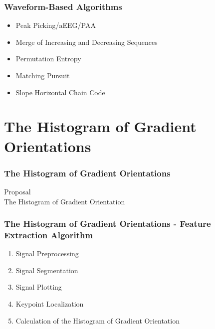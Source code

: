 \documentclass[aspectratio=169]{beamer}
\begin{document}
\begin{frame}
\frametitle{Waveform-Based Algorithms}
\begin{center}
\begin{itemize}
 \item<1-> Peak Picking/aEEG/PAA
 \item<2-> Merge of Increasing and Decreasing Sequences
 \item<3-> Permutation Entropy 
 \item<4-> Matching Pursuit
 \item<5-> Slope Horizontal Chain Code
\end{itemize}
\end{center}
\end{frame}


\section{The Histogram of Gradient Orientations}    
\begin{frame}
\frametitle{The Histogram of Gradient Orientations}
\begin{center}
\LARGE Proposal \\ The Histogram of Gradient Orientation
\end{center}
\end{frame}


\begin{frame}
\frametitle{The Histogram of Gradient Orientations - Feature Extraction Algorithm}
\begin{center}
\begin{enumerate}
 \item<1-> Signal Preprocessing
 \item<2-> Signal Segmentation
 \item<3-> Signal Plotting
 \item<4-> Keypoint Localization
 \item<5-> Calculation of the Histogram of Gradient Orientation
\end{enumerate}
\end{center}
\end{frame}
\end{document}
